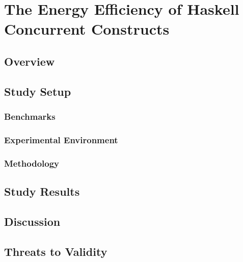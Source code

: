 \chapter{The Energy Efficiency of Haskell Concurrent Constructs}

\section{Overview}
\lipsum[1-4]


\section{Study Setup}
\lipsum[1-2]

\subsection{Benchmarks}
\lipsum[1-4]

\subsection{Experimental Environment}
\lipsum[1-4]

\subsection{Methodology}
\lipsum[1-4]


\section{Study Results}
\lipsum[1-2]


\section{Discussion}
\lipsum[1-2]


\section{Threats to Validity}
\lipsum[1-2]
